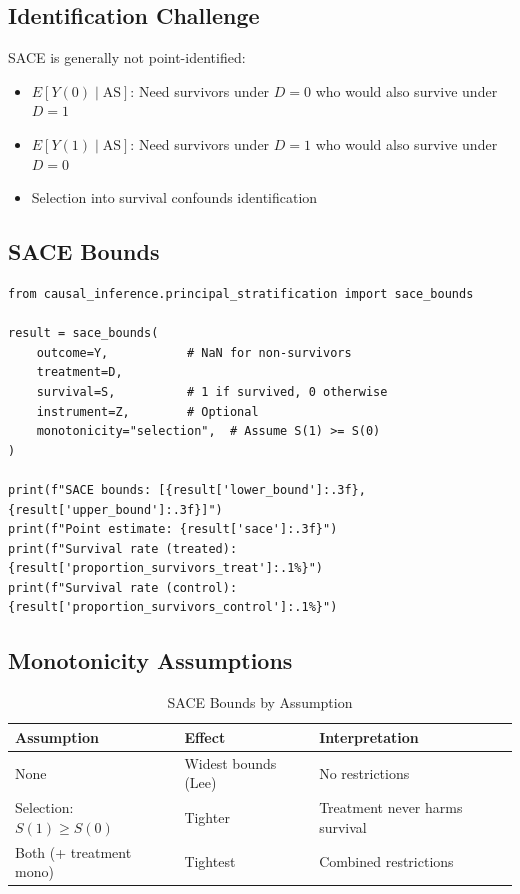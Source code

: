 \subsection{Identification Challenge}

SACE is generally not point-identified:
\begin{itemize}
\item $E[Y(0) \mid \text{AS}]$: Need survivors under $D=0$ who would also survive under $D=1$
\item $E[Y(1) \mid \text{AS}]$: Need survivors under $D=1$ who would also survive under $D=0$
\item Selection into survival confounds identification
\end{itemize}

\subsection{SACE Bounds}

\begin{verbatim}
from causal_inference.principal_stratification import sace_bounds

result = sace_bounds(
    outcome=Y,           # NaN for non-survivors
    treatment=D,
    survival=S,          # 1 if survived, 0 otherwise
    instrument=Z,        # Optional
    monotonicity="selection",  # Assume S(1) >= S(0)
)

print(f"SACE bounds: [{result['lower_bound']:.3f}, {result['upper_bound']:.3f}]")
print(f"Point estimate: {result['sace']:.3f}")
print(f"Survival rate (treated): {result['proportion_survivors_treat']:.1%}")
print(f"Survival rate (control): {result['proportion_survivors_control']:.1%}")
\end{verbatim}

\subsection{Monotonicity Assumptions}

\begin{table}[h]
\centering
\caption{SACE Bounds by Assumption}
\begin{tabular}{lll}
\toprule
Assumption & Effect & Interpretation \\
\midrule
None & Widest bounds (Lee) & No restrictions \\
Selection: $S(1) \geq S(0)$ & Tighter & Treatment never harms survival \\
Both (+ treatment mono) & Tightest & Combined restrictions \\
\bottomrule
\end{tabular}
\end{table}

